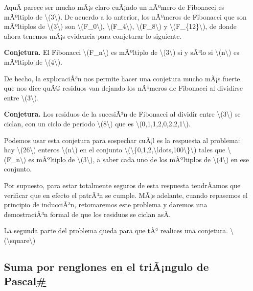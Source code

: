 \documentclass[
]{article}
\begin{document}
AquÃ­ parece ser mucho mÃ¡s claro cuÃ¡ndo un nÃºmero de Fibonacci es
mÃºltiplo de {\textbackslash(3\textbackslash)}. De acuerdo a lo
anterior, los nÃºmeros de Fibonacci que son mÃºltiplos de
{\textbackslash(3\textbackslash)} son
{\textbackslash(F\_0\textbackslash)},
{\textbackslash(F\_4\textbackslash)},
{\textbackslash(F\_8\textbackslash)} y
{\textbackslash(F\_\{12\}\textbackslash)}, de donde ahora tenemos mÃ¡s
evidencia para conjeturar lo siguiente.

\textbf{Conjetura.} El Fibonacci {\textbackslash(F\_n\textbackslash)} es
mÃºltiplo de {\textbackslash(3\textbackslash)} si y sÃ³lo si
{\textbackslash(n\textbackslash)} es mÃºltiplo de
{\textbackslash(4\textbackslash)}.

De hecho, la exploraciÃ³n nos permite hacer una conjetura mucho mÃ¡s
fuerte que nos dice quÃ© residuos van dejando los nÃºmeros de Fibonacci
al dividirse entre {\textbackslash(3\textbackslash)}.

\textbf{Conjetura.} Los residuos de la sucesiÃ³n de Fibonacci al dividir
entre {\textbackslash(3\textbackslash)} se ciclan, con un ciclo de
periodo {\textbackslash(8\textbackslash)} que es
{\textbackslash(0,1,1,2,0,2,2,1\textbackslash)}.

Podemos usar esta conjetura para sospechar cuÃ¡l es la respuesta al
problema: hay {\textbackslash(26\textbackslash)} enteros
{\textbackslash(n\textbackslash)} en el conjunto
{\textbackslash(\textbackslash\{0,1,2,\textbackslash ldots,100\textbackslash\}\textbackslash)}
tales que {\textbackslash(F\_n\textbackslash)} es mÃºltiplo de
{\textbackslash(3\textbackslash)}, a saber cada uno de los mÃºltiplos de
{\textbackslash(4\textbackslash)} en ese conjunto.

Por supuesto, para estar totalmente seguros de esta respuesta tendrÃ­amos
que verificar que en efecto el patrÃ³n se cumple. MÃ¡s adelante, cuando
repasemos el principio de inducciÃ³n, retomaremos este problema y
daremos una demostraciÃ³n formal de que los residuos se ciclan asÃ­.

La segunda parte del problema queda para que tÃº realices una conjetura.
{{\textbackslash(\textbackslash square\textbackslash)}}

\label{suma-por-renglones-en-el-triangulo-de-pascal}
\subsection{\texorpdfstring{Suma por renglones en el triÃ¡ngulo de
Pascal\hyperref[suma-por-renglones-en-el-triangulo-de-pascal]{\#}}{Suma por renglones en el triÃ¡ngulo de Pascal\#}}\label{suma-por-renglones-en-el-triuxe3ngulo-de-pascal}
\end{document}
